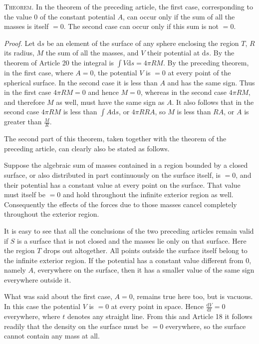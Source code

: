 \textsc{Theorem.} In the theorem of the preceding article, the first case, corresponding to the value $0$ of the constant potential $A$, can occur only if the sum of all the masses is itself $=0$. The second case can occur only if this sum is not $=0$.

\textit{Proof.} Let $\mathrm ds$ be an element of the surface of any sphere enclosing the region $T$, $R$ its radius, $M$ the sum of all the masses, and $V$ their potential at $\mathrm ds$. By the theorem of Article 20 the integral is $\int V\mathrm ds=4\pi RM$. By the preceding theorem, in the first case, where $A=0$, the potential $V$ is $=0$ at every point of the spherical surface. In the second case it is less than $A$ and has the same sign. Thus in the first case $4\pi RM=0$ and hence $M=0$, whereas in the second case $4\pi RM$, and therefore $M$ as well, must have the same sign as $A$. It also follows that in the second case $4\pi RM$ is less than $\int A\mathrm ds$, or $4\pi RRA$, so $M$ is less than $RA$, or $A$ is greater than $\frac{M}{R}$.

The second part of this theorem, taken together with the theorem of the preceding article, can clearly also be stated as follows.

Suppose the algebraic sum of masses contained in a region bounded by a closed surface, or also distributed in part continuously on the surface itself, is $=0$, and their potential has a constant value at every point on the surface. That value must itself be $=0$
and hold throughout the infinite exterior region as well. Consequently the effects of the forces due to those masses cancel completely throughout the exterior region.

It is easy to see that all the conclusions of the two preceding articles remain valid if $S$ is a surface that is not closed and the masses lie only on that surface. Here the region $T$ drops out altogether. All points outside the surface itself belong to the infinite exterior region. If the potential has a constant value different from $0$, namely $A$, everywhere on the surface, then it has a smaller value of the same sign everywhere outside it.

What was said about the first case, $A=0$, remains true here too, but is vacuous. In this case the potential $V$ is $=0$ at every point in space. Hence $\frac{\mathrm dV}{\mathrm dt}=0$ everywhere, where $t$ denotes any straight line. From this and Article 18 it follows readily that the density on the surface must be $=0$ everywhere, so the surface cannot contain any mass at all.

